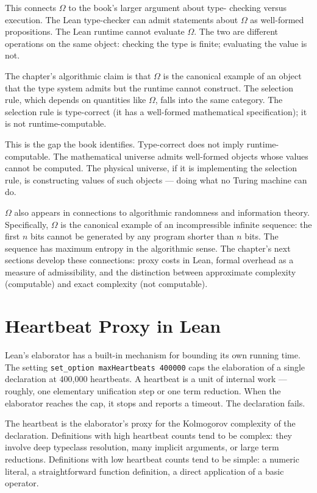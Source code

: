 This connects $\Omega$ to the book's larger argument about type-
checking versus execution. The Lean type-checker can admit
statements about $\Omega$ as well-formed propositions. The Lean
runtime cannot evaluate $\Omega$. The two are different
operations on the same object: checking the type is finite;
evaluating the value is not.

The chapter's algorithmic claim is that $\Omega$ is the canonical
example of an object that the type system admits but the runtime
cannot construct. The selection rule, which depends on quantities
like $\Omega$, falls into the same category. The selection rule is
type-correct (it has a well-formed mathematical specification); it
is not runtime-computable.

This is the gap the book identifies. Type-correct does not imply
runtime-computable. The mathematical universe admits well-formed
objects whose values cannot be computed. The physical universe, if
it is implementing the selection rule, is constructing values of
such objects --- doing what no Turing machine can do.

$\Omega$ also appears in connections to algorithmic randomness and
information theory. Specifically, $\Omega$ is the canonical example
of an incompressible infinite sequence: the first $n$ bits cannot be
generated by any program shorter than $n$ bits. The sequence has
maximum entropy in the algorithmic sense. The chapter's next
sections develop these connections: proxy costs in Lean, formal
overhead as a measure of admissibility, and the distinction
between approximate complexity (computable) and exact complexity
(not computable).

\section{Heartbeat Proxy in Lean}
\label{se:heartbeat-proxy-in-lean}

Lean's elaborator has a built-in mechanism for bounding its own
running time. The setting \texttt{set\_option maxHeartbeats 400000}
caps the elaboration of a single declaration at 400,000 heartbeats. A
heartbeat is a unit of internal work --- roughly, one elementary
unification step or one term reduction. When the elaborator reaches
the cap, it stops and reports a timeout. The declaration fails.

The heartbeat is the elaborator's proxy for the Kolmogorov
complexity of the declaration. Definitions with high heartbeat counts
tend to be complex: they involve deep typeclass resolution, many
implicit arguments, or large term reductions. Definitions with low
heartbeat counts tend to be simple: a numeric literal, a
straightforward function definition, a direct application of a
basic operator.

